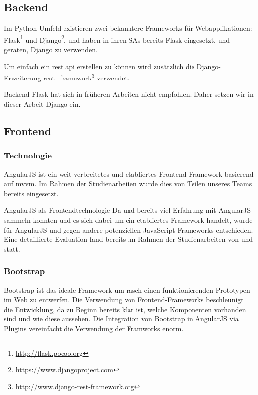 \subsection{Backend}
Im Python-Umfeld existieren zwei bekanntere Frameworks für Webapplikationen: Flask\footnote{\url{http://flask.pocoo.org}} und Django\footnote{\url{https://www.djangoproject.com}}. \fsc und \rli haben in ihren SAs bereits Flask eingesetzt, und geraten, Django zu verwenden.

Um einfach ein \acs{rest} \acs{api} erstellen zu können wird zusätzlich die Django-Erweiterung rest\_framework\footnote{\url{http://www.django-rest-framework.org}} verwendet.

\begin{decision}{Backend}
Flask hat sich in früheren Arbeiten nicht empfohlen. Daher setzen wir in dieser Arbeit Django ein.
\end{decision}



\subsection{Frontend}
\subsubsection{Technologie}
AngularJS ist ein weit verbreitetes und etabliertes Frontend Framework basierend auf \acs{mvvm}. Im Rahmen der Studienarbeiten wurde dies von Teilen unseres Teams bereits eingesetzt.

\begin{decision}[label=dec:frontend:technology]{AngularJS als Frontendtechnologie}
Da \chuf und \fscf bereits viel Erfahrung mit AngularJS sammeln konnten und es sich dabei um ein etabliertes Framework handelt, wurde für AngularJS und gegen andere potenziellen JavaScript Frameworks entschieden. Eine detaillierte Evaluation fand bereits im Rahmen der Studienarbeiten von \fscf und \rlif statt.
\end{decision}

\subsubsection{Bootstrap}
Bootstrap ist das ideale Framework um rasch einen funktionierenden Prototypen im Web zu entwerfen. Die Verwendung von Frontend-Frameworks beschleunigt die Entwicklung, da zu Beginn bereits klar ist, welche Komponenten vorhanden sind und wie diese aussehen. Die Integration von Bootstrap in AngularJS via Plugins vereinfacht die Verwendung der Framworks enorm.

